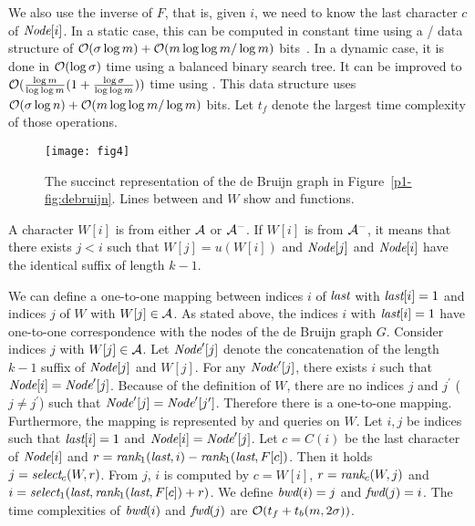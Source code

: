 We also use the inverse of $F$, that is, given $i$, we need to know the last character $c$
of ${\textit{Node}}[i]$.  In a static case, this can be
computed in constant time using a {\rank}/{\select} data structure of
$\mathcal{O}(\sigma \log m) + \mathcal{O}(m \log\log m/\log m)$ bits~\cite{RRR07}.
In a dynamic case, it is done in $\mathcal{O}(\log \sigma)$ time using a balanced
binary search tree.
%
It can be improved to $\mathcal{O}(\frac{\log m }{\log \log m}
(1+\frac{\log\sigma}{\log\log m}))$ time using \cite{NavSad10}.
This data structure uses
$\mathcal{O}(\sigma \log n) + \mathcal{O}(m \log \log m/\log m)$ bits.
%
Let $t_f$ denote the largest time complexity of those operations.


\begin{figure}[bt]
\begin{center}
  \texttt{[image: fig4]}
\caption{The succinct representation of the de Bruijn graph in Figure~\ref{p1-fig:debruijn}.
Lines between {\Node} and $W$ show {\fwd} and {\bwd} functions.
}
\label{p1-fig:succinctdebruijn}
\end{center}
\end{figure}


A character $W[i]$ is from either ${\cal A}$ or ${\cal A}^-$.
If $W[i]$ is from ${\cal A}^-$, it means that there exists $j < i$ such that
$W[j] = u(W[i])$ and ${\textit{Node}}[j]$ and ${\textit{Node}}[i]$ have the identical suffix of length $k-1$.

We can define a one-to-one mapping between indices $i$ of ${\textit{last}}$ with ${\textit{last}}[i] = 1$
and indices $j$ of $W$ with $W[j] \in {\cal A}$.
As stated above, the indices $i$ with ${\textit{last}}[i] = 1$ have one-to-one correspondence with
the nodes of the de Bruijn graph $G$.  Consider indices $j$ with $W[j] \in {\cal A}$.
Let ${\textit{Node}}^\prime[j]$ denote
the concatenation of the length $k-1$ suffix of ${\textit{Node}}[j]$ and $W[j]$.
For any ${\textit{Node}}^\prime[j]$, there exists $i$ such that ${\textit{Node}}[i] = {\textit{Node}}^\prime[j]$.
Because of the definition of $W$, there are no indices $j$ and $j^\prime$ 
($j \neq j^\prime$) such that ${\textit{Node}}^\prime[j] = {\textit{Node}}^\prime[j^\prime]$.
Therefore there is a one-to-one mapping.  Furthermore, the mapping is represented by
{\rank} and {\select} queries on $W$.
Let $i,j$ be indices such that ${\textit{last}}[i] = 1$ and ${\textit{Node}}[i] = {\textit{Node}}^\prime[j]$.
Let $c = C(i)$ be the last character of ${\textit{Node}}[i]$ and 
$r = {\textit{rank}}_1({\textit{last}}, i) - {\textit{rank}}_1({\textit{last}}, F[c])$.
Then it holds $j = {\textit{select}}_c(W, r)$.  
From $j$, $i$ is computed by $c = W[i]$, $r = {\textit{rank}}_c(W, j)$ and
$i = {\textit{select}}_1({\textit{last}}, {\textit{rank}}_1({\textit{last}}, F[c]) + r)$.
We define $\textit{bwd}(i) = j$ and $\textit{fwd}(j) = i$.
The time complexities of $\textit{bwd}(i)$ and $\textit{fwd}(j)$ are
$\mathcal{O}(t_f + t_b(m,2\sigma))$.

